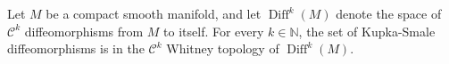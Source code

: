 \documentclass[12pt]{article}
\newcommand{\N}{\mathbb{N}}
\newcommand{\Diff}{\operatorname{Diff}}
\begin{document}
Let $M$ be a compact smooth manifold, and let $\Diff^k(M)$ denote the space of $\mathcal{C}^k$ diffeomorphisms from $M$ to itself. For every $k\in \N$, the set of Kupka-Smale diffeomorphisms is  in the $\mathcal{C}^k$ Whitney topology of $\Diff^k(M)$.
\end{document}
